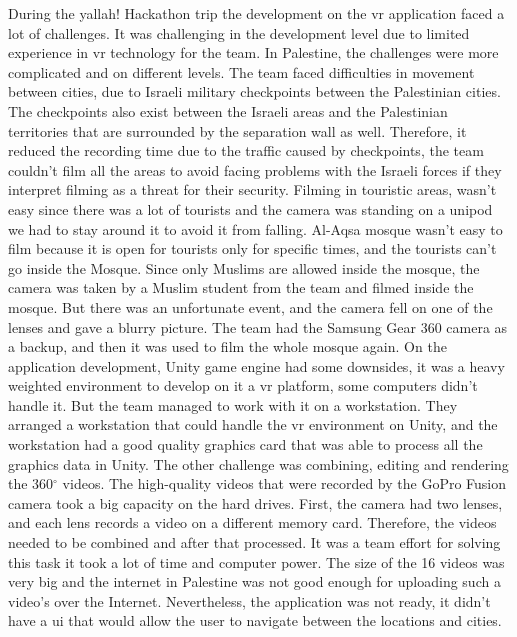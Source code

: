 During the \acrshort{yallah!} Hackathon trip the development on the \acrshort{vr} application faced a lot of challenges. It was challenging in the development level due to limited experience in \acrshort{vr} technology for the team. In Palestine, the challenges were more complicated and on different levels. The team faced difficulties in movement between cities, due to Israeli military checkpoints between the Palestinian cities. The checkpoints also exist between the Israeli areas and the Palestinian territories that are surrounded by the separation wall as well. Therefore, it reduced the recording time due to the traffic caused by checkpoints, the team couldn't film all the areas to avoid facing problems with the Israeli forces if they interpret filming as a threat for their security. Filming in touristic areas, wasn’t easy since there was a lot of tourists and the camera was standing on a unipod we had to stay around it to avoid it from falling. Al-Aqsa mosque wasn’t easy to film because it is open for tourists only for specific times, and the tourists can’t go inside the Mosque. Since only Muslims are allowed inside the mosque, the camera was taken by a Muslim student from the team and filmed inside the mosque. But there was an unfortunate event, and the camera fell on one of the lenses and gave a blurry picture. The team had the Samsung Gear 360 camera as a backup, and then it was used to film the whole mosque again. On the application development, Unity game engine had some downsides, it was a heavy weighted environment to develop on it a \acrshort{vr} platform, some computers didn’t handle it. But the team managed to work with it on a workstation. They arranged a workstation that could handle the \acrshort{vr} environment on Unity, and the workstation had a good quality graphics card that was able to process all the graphics data in Unity. The other challenge was combining, editing and rendering the 360$^{\circ}$ videos. The high-quality videos that were recorded by the GoPro Fusion camera took a big capacity on the hard drives. First, the camera had two lenses, and each lens records a video on a different memory card. Therefore, the videos needed to be combined and after that processed. It was a team effort for solving this task it took a lot of time and computer power. The size of the
16
videos was very big and the internet in Palestine was not good enough for uploading such a video’s over the Internet. Nevertheless, the application was not ready, it didn't have a \acrfull{ui} that would allow the user to navigate between the locations and cities. 
